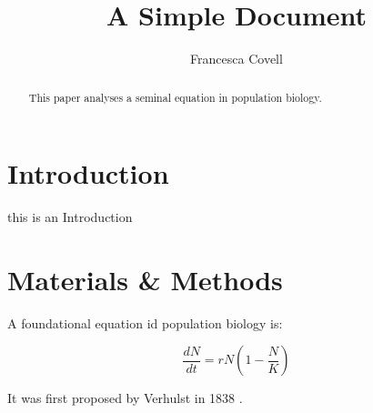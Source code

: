 \documentclass[12pt]{article}
\title{A Simple Document}
\author{Francesca Covell}
\date{}
\begin{document}
    \maketitle

\begin{abstract}
    This paper analyses a seminal equation in population biology.
\end{abstract}

\section{Introduction}
    this is an Introduction

\section{Materials \& Methods}

A foundational equation id population biology is:

\begin{equation}
    \frac{dN}{dt} = r N ( 1 - \frac{N}{K})
\end{equation}

It was first proposed by Verhulst in 1838 \cite{verhulst1838notice}.




\end{document}
